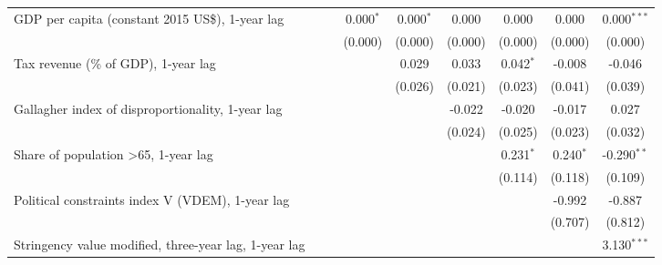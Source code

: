 \begin{table}[htbp]
\begin{tabular}{lcccccccc}
      GDP per capita (constant 2015 US\$), 1-year lag                                 &               &               & 0.000$^{*}$  & 0.000$^{*}$ & 0.000   & 0.000        & 0.000       & 0.000$^{***}$\\   
                                                                                      &               &               & (0.000)      & (0.000)     & (0.000) & (0.000)      & (0.000)     & (0.000)\\   
      Tax revenue (\% of GDP), 1-year lag                                             &               &               &              & 0.029       & 0.033   & 0.042$^{*}$  & -0.008      & -0.046\\   
                                                                                      &               &               &              & (0.026)     & (0.021) & (0.023)      & (0.041)     & (0.039)\\   
      Gallagher index of disproportionality, 1-year lag                               &               &               &              &             & -0.022  & -0.020       & -0.017      & 0.027\\   
                                                                                      &               &               &              &             & (0.024) & (0.025)      & (0.023)     & (0.032)\\   
      Share of population >65, 1-year lag                                             &               &               &              &             &         & 0.231$^{*}$  & 0.240$^{*}$ & -0.290$^{**}$\\   
                                                                                      &               &               &              &             &         & (0.114)      & (0.118)     & (0.109)\\   
      Political constraints index V (VDEM), 1-year lag                                &               &               &              &             &         &              & -0.992      & -0.887\\   
                                                                                      &               &               &              &             &         &              & (0.707)     & (0.812)\\   
      Stringency value modified, three-year lag, 1-year lag                           &               &               &              &             &         &              &             & 3.130$^{***}$\\   

\end{tabular}
\end{table}
